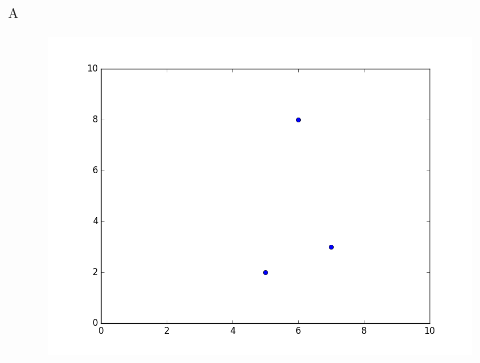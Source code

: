 \documentclass{article}
\begin{document}
  {{ A }}
	\begin{figure}
		\includegraphics[scale=0.5]{myfig.png}\\
	\end{figure}  
\end{document}
